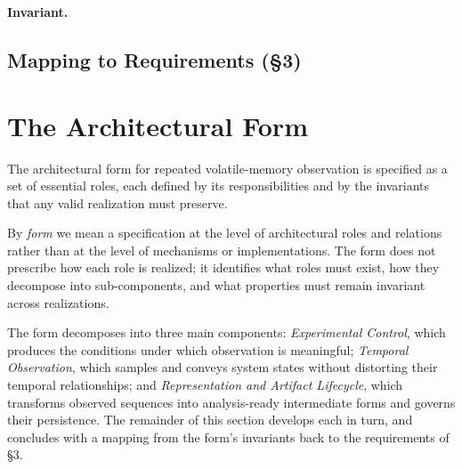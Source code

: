   \textbf{Invariant.} %

\subsection*{Mapping to Requirements (§3)}




\section{The Architectural Form}

The architectural form for repeated volatile-memory observation is specified as a set of essential roles, each defined by its responsibilities and by the invariants that any valid realization must preserve.

By \emph{form} we mean a specification at the level of architectural roles and relations rather than at the level of mechanisms or implementations. The form does not prescribe how each role is realized; it identifies what roles must exist, how they decompose into sub-components, and what properties must remain invariant across realizations.

The form decomposes into three main components: \emph{Experimental Control}, which produces the conditions under which observation is meaningful; \emph{Temporal Observation}, which samples and conveys system states without distorting their temporal relationships; and \emph{Representation and Artifact Lifecycle}, which transforms observed sequences into analysis-ready intermediate forms and governs their persistence. The remainder of this section develops each in turn, and concludes with a mapping from the form's invariants back to the requirements of \S3.

